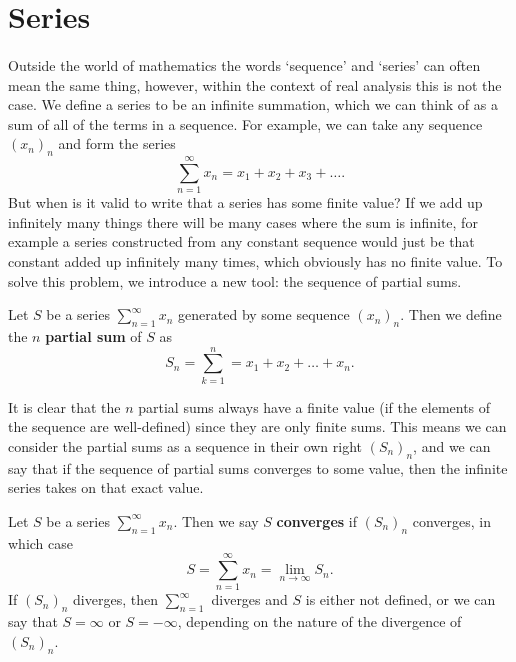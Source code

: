 \documentclass[../real_analysis.tex]{subfiles}
\begin{document}
    \section{Series}
        \paragraph{}
        Outside the world of mathematics the words `sequence' and `series' can often mean the same thing, however, within the context of real analysis this is not the case. We define a series to be an infinite summation, which we can think of as a sum of all of the terms in a sequence. For example, we can take any sequence $(x_n)_n$ and form the series
        \begin{equation*}
            \sum_{n=1}^\infty x_n=x_1+x_2+x_3+\dots.
        \end{equation*}
        But when is it valid to write that a series has some finite value? If we add up infinitely many things there will be many cases where the sum is infinite, for example a series constructed from any constant sequence would just be that constant added up infinitely many times, which obviously has no finite value. To solve this problem, we introduce a new tool: the sequence of partial sums.
        \begin{definition}
            Let $S$ be a series $\sum_{n=1}^\infty x_n$ generated by some sequence $(x_n)_n$. Then we define the $n$ \textbf{partial sum} of $S$ as
            \begin{equation*}
                S_n=\sum_{k=1}^n=x_1+x_2+\dots+x_n.
            \end{equation*}
        \end{definition}
        It is clear that the $n$ partial sums always have a finite value (if the elements of the sequence are well-defined) since they are only finite sums. This means we can consider the partial sums as a sequence in their own right $(S_n)_n$, and we can say that if the sequence of partial sums converges to some value, then the infinite series takes on that exact value.
        \begin{definition}
            Let $S$ be a series $\sum_{n=1}^\infty x_n$. Then we say $S$ \textbf{converges} if $(S_n)_n$ converges, in which case
            \begin{equation*}
                S=\sum_{n=1}^\infty x_n=\lim_{n\to\infty}S_n.
            \end{equation*}
            If $(S_n)_n$ diverges, then $\sum_{n=1}^\infty$ diverges and $S$ is either not defined, or we can say that $S=\infty$ or $S=-\infty$, depending on the nature of the divergence of $(S_n)_n$.
        \end{definition}
\end{document}
